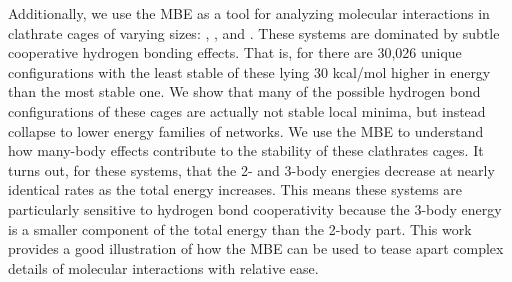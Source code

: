 \documentclass[11pt, proquest]{uwthesis}[2020/02/24]
\let\ce\ch
\newcommand{\textapprox}{\raisebox{0.5ex}{\texttildelow}}
\begin{document}
{\par Additionally, we use the MBE as a tool for analyzing molecular interactions in clathrate cages of varying sizes: \ce{(H2O)_{20}}, \ce{(H2O)_{24}}, and \ce{(H2O)_{28}}. These systems are dominated by subtle cooperative hydrogen bonding effects. That is, for \ce{(H2O)_{20}} there are 30,026 unique configurations with the least stable of these lying \textapprox30 kcal/mol higher in energy than the most stable one. We show that many of the possible hydrogen bond configurations of these cages are actually not stable local minima, but instead collapse to lower energy families of networks. We use the MBE to understand how many-body effects contribute to the stability of these clathrates cages. It turns out, for these systems, that the 2- and 3-body energies decrease at nearly identical rates as the total energy increases. This means these systems are particularly sensitive to hydrogen bond cooperativity because the 3-body energy is a smaller component of the total energy than the 2-body part. This work provides a good illustration of how the MBE can be used to tease apart complex details of molecular interactions with relative ease.
}
 
%
%
\tableofcontents
\listoffigures
\listoftables  %
 
%
%
 
%
%
\end{document}
